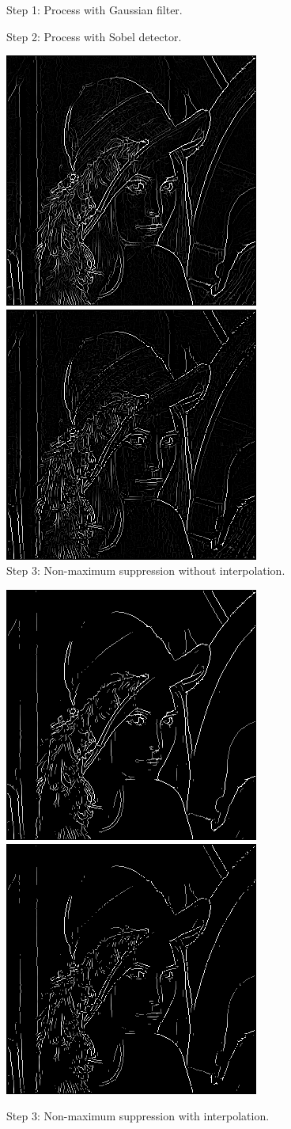 \documentclass[10pt,twocolumn,letterpaper]{article}
\begin{document}
\begin{figure}[htp]
\begin{center}
		\caption{Step 1: Process with Gaussian filter.}
		\caption{Step 2: Process with Sobel detector.}
		\includegraphics[width=.473\linewidth]{../../code/cannySuppressionPaperLena.png} \quad
		\includegraphics[width=.473\linewidth]{../../code/cannySuppressionInterpolationLena.png} \\
		\caption{Step 3: Non-maximum suppression without interpolation. }
		\caption{Step 3: Non-maximum suppression with interpolation. } 
		\includegraphics[width=.473\linewidth]{../../code/cannyThresholdPaperLena.png}	\quad
		\includegraphics[width=.473\linewidth]{../../code/cannyThresholdInterpolationLena.png} \\

\end{center}
\end{figure}
\end{document}
